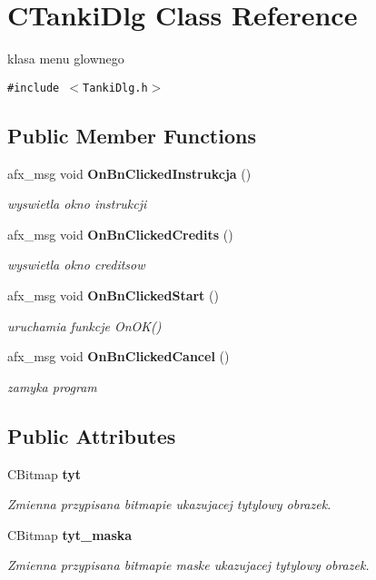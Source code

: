 \section{CTankiDlg Class Reference}
\label{class_c_tanki_dlg}
klasa menu glownego  


{\tt \#include $<$TankiDlg.h$>$}

\subsection*{Public Member Functions}
\begin{CompactItemize}
\item 
afx\_\-msg void {\bf OnBnClickedInstrukcja} ()
\begin{CompactList}\small\item\em wyswietla okno instrukcji \item\end{CompactList}\item 
afx\_\-msg void {\bf OnBnClickedCredits} ()
\begin{CompactList}\small\item\em wyswietla okno creditsow \item\end{CompactList}\item 
afx\_\-msg void {\bf OnBnClickedStart} ()
\begin{CompactList}\small\item\em uruchamia funkcje OnOK() \item\end{CompactList}\item 
afx\_\-msg void {\bf OnBnClickedCancel} ()\label{class_c_tanki_dlg_abc93d35af70783e83eb039c365d2076}

\begin{CompactList}\small\item\em zamyka program \item\end{CompactList}\end{CompactItemize}
\subsection*{Public Attributes}
\begin{CompactItemize}
\item 
CBitmap {\bf tyt}\label{class_c_tanki_dlg_58dbfd205542585abc35cc777d5f8f31}

\begin{CompactList}\small\item\em Zmienna przypisana bitmapie ukazujacej tytylowy obrazek. \item\end{CompactList}\item 
CBitmap {\bf tyt\_\-maska}\label{class_c_tanki_dlg_57c1d0e55e1f9d7b3a95e433f4ed9bd4}

\begin{CompactList}\small\item\em Zmienna przypisana bitmapie maske ukazujacej tytylowy obrazek. \item\end{CompactList}\end{CompactItemize}
